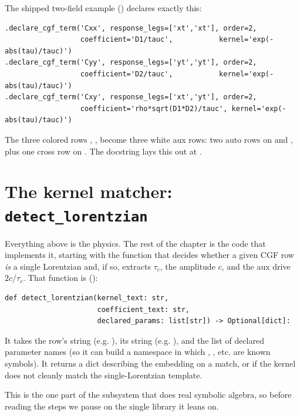 The shipped two-field example
() declares
exactly this:
\begin{lstlisting}
.declare_cgf_term('Cxx', response_legs=['xt','xt'], order=2,
                  coefficient='D1/tauc',           kernel='exp(-abs(tau)/tauc)')
.declare_cgf_term('Cyy', response_legs=['yt','yt'], order=2,
                  coefficient='D2/tauc',           kernel='exp(-abs(tau)/tauc)')
.declare_cgf_term('Cxy', response_legs=['xt','yt'], order=2,
                  coefficient='rho*sqrt(D1*D2)/tauc', kernel='exp(-abs(tau)/tauc)')
\end{lstlisting}
The three colored rows , ,  become three white
aux rows: two auto rows on  and , plus one cross
row on . The docstring lays this out at
.

\section{The kernel matcher: \texttt{detect\_lorentzian}}\label{sec:cm-detect}

Everything above is the physics. The rest of the chapter is the code that
implements it, starting with the function that decides whether a given CGF row
\emph{is} a single Lorentzian and, if so, extracts $\tau_c$, the amplitude $c$,
and the aux drive $2c/\tau_c$. That function is 
():

\begin{lstlisting}
def detect_lorentzian(kernel_text: str,
                      coefficient_text: str,
                      declared_params: list[str]) -> Optional[dict]:
\end{lstlisting}

It takes the row's  string (e.g. ), its
 string (e.g. ), and the list of declared
parameter names (so it can build a namespace in which , , etc.
are known symbols). It returns a dict describing the embedding on a match, or
 if the kernel does not cleanly match the single-Lorentzian template.

This is the one part of the subsystem that does real symbolic algebra, so before
reading the steps we pause on the single library it leans on.


